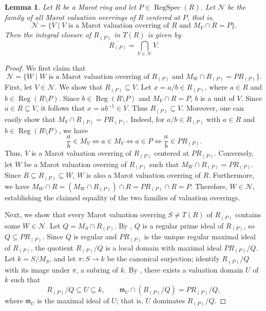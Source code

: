 \documentclass[12pt]{article}
\newtheorem{lemma}{Lemma}
\newcommand{\Reg}{\operatorname{Reg}}
\newcommand{\RegSpec}{\operatorname{RegSpec}}
\begin{document}
	\begin{lemma}\label{centered}
		Let $R$ be a Marot ring and let $P\in\RegSpec(R)$. Let $\mathcal N$ be the family of all Marot valuation overrings of $R$ centered at $P$, that is,
		\[\mathcal N=\{V\mid V\text{ is a Marot valuation overring of }R\text{ and }M_V\cap R=P\}.\]
		Then the integral closure of $R_{(P)}$ in $T(R)$ is given by
		\[\overline{R_{(P)}}=\bigcap_{V\in\mathcal N}V.\]
	\end{lemma}
	\begin{proof}
		We first claim that
		\[
		\mathcal N=\{W\mid W\text{ is a Marot valuation overring of }R_{(P)}\text{ and }M_W\cap R_{(P)}=PR_{(P)}\}.
		\]
		First, let $V\in\mathcal N$. We show that $R_{(P)}\subseteq V$. Let $x=a/b\in R_{(P)}$, where $a\in R$ and $b\in\Reg(R\setminus P)$. Since $b\in\Reg(R\setminus P)$ and $M_V\cap R=P$, $b$ is a unit of $V$. Since $a\in R\subseteq V$, it follows that $x=ab^{-1}\in V$. Thus $R_{(P)}\subseteq V$. Moreover, one can easily show that $M_V\cap R_{(P)}=PR_{(P)}$. Indeed, for $a/b\in R_{(P)}$ with $a\in R$ and $b\in\Reg(R\setminus P)$, we have
		\[
		\frac{a}{b}\in M_V\Longleftrightarrow a\in M_V\Longleftrightarrow a\in P\Longleftrightarrow\frac{a}{b}\in PR_{(P)}.
		\]
		Thus, $V$ is a Marot valuation overring of $R_{(P)}$ centered at $PR_{(P)}$. Conversely, let $W$ be a Marot valuation overring of $R_{(P)}$ such that $M_W\cap R_{(P)}=PR_{(P)}$. Since $R\subseteq R_{(P)}\subseteq W$, $W$ is also a Marot valuation overring of $R$. Furthermore, we have $M_W\cap R=(M_W\cap R_{(P)})\cap R=PR_{(P)}\cap R=P$. Therefore, $W\in\mathcal N$, establishing the claimed equality of the two families of valuation overrings.
		
		Next, we show that every Marot valuation overring $S\neq T(R)$ of $R_{(P)}$ contains some $W\in\mathcal N$. Let $Q=M_S\cap R_{(P)}$. By \cite[Theorem 2.4]{marot}, $Q$ is a regular prime ideal of $R_{(P)}$, so $Q\subseteq PR_{(P)}$. Since $Q$ is regular and $PR_{(P)}$ is the unique regular maximal ideal of $R_{(P)}$, the quotient $R_{(P)}/Q$ is a local domain with maximal ideal $PR_{(P)}/Q$. Let $k=S/M_S$, and let $\pi:S\to k$ be the canonical surjection; identify $R_{(P)}/Q$ with its image under $\pi$, a subring of $k$. By \cite[Theorem 5.2]{huckaba}, there exists a valuation domain $U$ of $k$ such that
		\[
		R_{(P)}/Q\subseteq U\subseteq k,\qquad \mathfrak{m}_U\cap(R_{(P)}/Q)=PR_{(P)}/Q,
		\]
		where $\mathfrak{m}_U$ is the maximal ideal of $U$; that is, $U$ dominates $R_{(P)}/Q$.
		

\end{proof}
\end{document}
